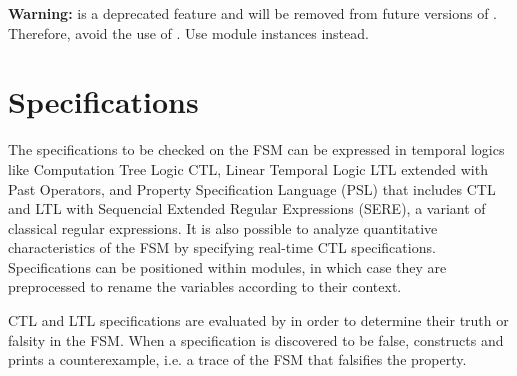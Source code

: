 \textbf{Warning:}  is a deprecated feature and will be
removed from future versions of \nusmv. Therefore, avoid the use of
. Use module instances instead.


\section{Specifications}
%
The specifications to be checked on the FSM can be expressed in
temporal logics like Computation Tree Logic CTL, Linear Temporal Logic
LTL extended with Past Operators, and Property Specification Language
(PSL) \cite{PSLLRM} that includes CTL and LTL with Sequencial Extended
Regular Expressions (SERE), a variant of classical regular expressions.
%
It is also possible to analyze quantitative characteristics of the FSM
by specifying real-time CTL specifications.
%
Specifications can be positioned within modules, in which case they
are preprocessed to rename the variables according to their context.

CTL and LTL specifications are evaluated by \nusmv in order to
determine their truth or falsity in the FSM.
%
When a specification is discovered to be false, \nusmv constructs and
prints a counterexample, i.e. a trace of the FSM that falsifies the
property.

